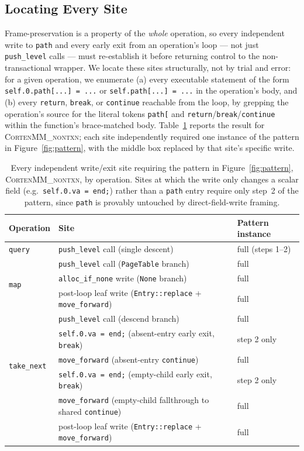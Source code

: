 \documentclass[10pt]{article}
\newcommand{\corten}[1]{\textsc{CortenMM\_#1}}
\newcommand{\vfn}[1]{\texttt{#1}}
\begin{document}
\subsection{Locating Every Site}
\label{sec:method:allsites}

Frame-preservation is a property of the \emph{whole} operation, so every
independent write to \vfn{path} and every early exit from an
operation's loop --- not just \vfn{push\_level} calls --- must
re-establish it before returning control to the non-transactional
wrapper. We locate these sites structurally, not by trial and error:
for a given operation, we enumerate (a) every executable statement of
the form \lstinline[style=verus]{self.0.path[...] = ...} or
\lstinline[style=verus]{self.path[...] = ...} in the operation's body,
and (b) every \vfn{return}, \vfn{break}, or \vfn{continue} reachable
from the loop, by grepping the operation's source for the
literal tokens \texttt{path[} and \texttt{return}/\texttt{break}/\texttt{continue}
within the function's brace-matched body. Table~\ref{tab:variants-sites}
reports the result for \corten{nontxn}; each site independently
required one instance of the pattern in Figure~\ref{fig:pattern}, with
the middle box replaced by that site's specific write.

\begin{table}[h]
\centering
\caption{Every independent write/exit site requiring the pattern in
Figure~\ref{fig:pattern}, \corten{nontxn}, by operation. Sites at which
the write only changes a scalar field (e.g.\ \lstinline[style=verus]{self.0.va = end;})
rather than a \texttt{path} entry require only step~2 of the pattern,
since \texttt{path} is provably untouched by direct-field-write framing.}
\label{tab:variants-sites}
\small
\begin{tabular}{@{}lll@{}}
\toprule
Operation & Site & Pattern instance \\
\midrule
\vfn{query} & \vfn{push\_level} call (single descent) & full (steps 1--2) \\
\midrule
\multirow{3}{*}{\vfn{map}}
  & \vfn{push\_level} call (\vfn{PageTable} branch) & full \\
  & \vfn{alloc\_if\_none} write (\vfn{None} branch) & full \\
  & post-loop leaf write (\vfn{Entry::replace} + \vfn{move\_forward}) & full \\
\midrule
\multirow{5}{*}{\vfn{take\_next}}
  & \vfn{push\_level} call (descend branch) & full \\
  & \texttt{self.0.va = end;} (absent-entry early exit, \vfn{break}) & step 2 only \\
  & \vfn{move\_forward} (absent-entry \vfn{continue}) & full \\
  & \texttt{self.0.va = end;} (empty-child early exit, \vfn{break}) & step 2 only \\
  & \vfn{move\_forward} (empty-child fallthrough to shared \vfn{continue}) & full \\
  & post-loop leaf write (\vfn{Entry::replace} + \vfn{move\_forward}) & full \\
\bottomrule
\end{tabular}
\end{table}
\end{document}
